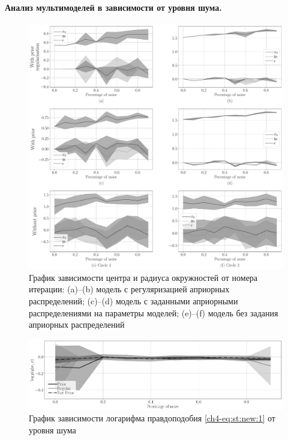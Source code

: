 \paragraph{Анализ мультимоделей в зависимости от уровня шума.} 
\begin{figure}[!ht]\center
\includegraphics[width=1\textwidth]{results/priorexpert/experiment_synthetic_param_progress_noise}
\caption{График зависимости центра и радиуса окружностей от номера итерации: (a)--(b) модель с регуляризацией априорных распределений; (c)--(d) модель с заданными априорными распределениями на параметры моделей; (e)--(f) модель без задания априорных распределений}
\label{ch4-experiment:st:3:1}
\end{figure}

\begin{figure}[!ht]\center
\includegraphics[width=1\textwidth]{results/priorexpert/experiment_synt_likelihood_progress_noise}
\caption{График зависимости логарифма правдоподобия \eqref{ch4-eq:st:new:1} от уровня шума
}
\label{ch4-experiment:st:3:2}
\end{figure}

